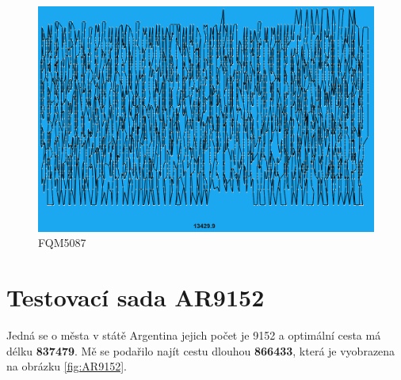 \begin{table}[ht]
\centering
\caption{FQM5087 -- S zaokrouhlením}
\end{table}


\begin{figure}[H]
    \centering
    \includegraphics[width=15cm]{obrazky-figures/FQM5087.png}
    \caption{FQM5087}
    \label{fig:FQM5087}
\end{figure}

\section{Testovací sada AR9152}
Jedná se o města v státě Argentina jejich počet je 9152 a optimální cesta má délku \textbf{837479}. Mě se podařilo najít cestu dlouhou \textbf{866433}, která je vyobrazena na obrázku \ref{fig:AR9152}.

